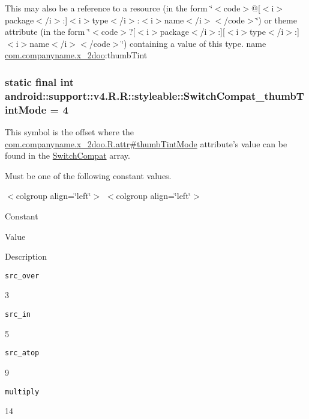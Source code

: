 This may also be a reference to a resource (in the form \char`\"{}$<$code$>$@\mbox{[}$<$i$>$package$<$/i$>$:\mbox{]}$<$i$>$type$<$/i$>$:$<$i$>$name$<$/i$>$$<$/code$>$\char`\"{}) or theme attribute (in the form \char`\"{}$<$code$>$?\mbox{[}$<$i$>$package$<$/i$>$:\mbox{]}\mbox{[}$<$i$>$type$<$/i$>$:\mbox{]}$<$i$>$name$<$/i$>$$<$/code$>$\char`\"{}) containing a value of this type.  name \hyperlink{namespacecom_1_1companyname_1_1x__2doo}{com.companyname.x\_\-2doo}:thumbTint \hypertarget{classandroid_1_1support_1_1v4_1_1_r_1_1styleable_6e084fdf50ded0b3372355ed70bb4849}{
\subsubsection[{SwitchCompat\_\-thumbTintMode}]{\setlength{\rightskip}{0pt plus 5cm}static final int android::support::v4.R.R::styleable::SwitchCompat\_\-thumbTintMode = 4}}
\label{classandroid_1_1support_1_1v4_1_1_r_1_1styleable_6e084fdf50ded0b3372355ed70bb4849}


This symbol is the offset where the \hyperlink{classcom_1_1companyname_1_1x__2doo_1_1_r_1_1attr_169fcb550f77b4c98b327a51a75a2c53}{com.companyname.x\_\-2doo.R.attr\#thumbTintMode} attribute's value can be found in the \hyperlink{classandroid_1_1support_1_1v4_1_1_r_1_1styleable_276d9c1ec80821a3e0fcdaa41daa75a0}{SwitchCompat} array.

Must be one of the following constant values. \begin{TabularC}{0}
\hline
\end{TabularC}
$<$colgroup align=\char`\"{}left\char`\"{}$>$ $<$colgroup align=\char`\"{}left\char`\"{}$>$ 

Constant

Value

Description 

{\tt src\_\-over}

3

{\tt src\_\-in}

5

{\tt src\_\-atop}

9

{\tt multiply}

14

